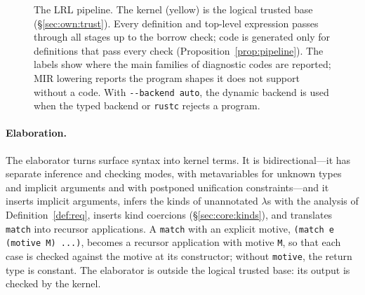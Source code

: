 \begin{figure}[t]
\caption{The LRL pipeline. The kernel (yellow) is the logical trusted base (\S\ref{sec:own:trust}). Every definition and top-level expression passes through all stages up to the borrow check; code is generated only for definitions that pass every check (Proposition~\ref{prop:pipeline}). The labels show where the main families of diagnostic codes are reported; MIR lowering reports the program shapes it does not support without a code. With \texttt{-{}-backend auto}, the dynamic backend is used when the typed backend or \texttt{rustc} rejects a program.}
\label{fig:pipeline}
\end{figure}

\paragraph{Elaboration.}
The elaborator turns surface syntax into kernel terms.
It is bidirectional---it has separate inference and checking modes, with metavariables for unknown types and implicit arguments and with postponed unification constraints---and it inserts implicit arguments, infers the kinds of unannotated $\lambda$s with the analysis of Definition~\ref{def:req}, inserts kind coercions (\S\ref{sec:core:kinds}), and translates \lstinline|match| into recursor applications.
A \lstinline|match| with an explicit motive, \lstinline|(match e (motive M) ...)|, becomes a recursor application with motive \lstinline|M|, so that each case is checked against the motive at its constructor; without \lstinline|motive|, the return type is constant.
The elaborator is outside the logical trusted base: its output is checked by the kernel.

